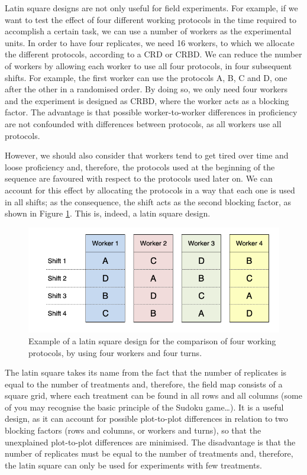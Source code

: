 \documentclass[a4paper,12pt,oneside]{book}
\begin{document}
Latin square designs are not only useful for field experiments. For example, if we want to test the effect of four different working protocols in the time required to accomplish a certain task, we can use a number of workers as the experimental units. In order to have four replicates, we need 16 workers, to which we allocate the different protocols, according to a CRD or CRBD. We can reduce the number of workers by allowing each worker to use all four protocols, in four subsequent shifts. For example, the first worker can use the protocols A, B, C and D, one after the other in a randomised order. By doing so, we only need four workers and the experiment is designed as CRBD, where the worker acts as a blocking factor. The advantage is that possible worker-to-worker differences in proficiency are not confounded with differences between protocols, as all workers use all protocols.

However, we should also consider that workers tend to get tired over time and loose proficiency and, therefore, the protocols used at the beginning of the sequence are favoured with respect to the protocols used later on. We can account for this effect by allocating the protocols in a way that each one is used in all shifts; as the consequence, the shift acts as the second blocking factor, as shown in Figure \ref{fig:figName36}. This is, indeed, a latin square design.

\begin{figure}

{\centering \includegraphics[width=0.9\linewidth]{_images/TurniOperatori} 

}

\caption{Example of a latin square design for the comparison of four working protocols, by using four workers and four turns.}\label{fig:figName36}
\end{figure}

The latin square takes its name from the fact that the number of replicates is equal to the number of treatments and, therefore, the field map consists of a square grid, where each treatment can be found in all rows and all columns (some of you may recognise the basic principle of the Sudoku game\ldots). It is a useful design, as it can account for possible plot-to-plot differences in relation to two blocking factors (rows and columns, or workers and turns), so that the unexplained plot-to-plot differences are minimised. The disadvantage is that the number of replicates must be equal to the number of treatments and, therefore, the latin square can only be used for experiments with few treatments.
\end{document}
